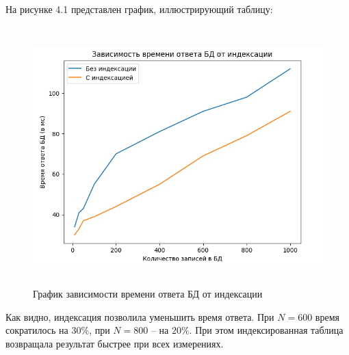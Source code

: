 На рисунке 4.1 представлен график, иллюстрирующий таблицу:
\FloatBarrier
\begin{figure}[h]	
	\begin{center}
		\includegraphics[height=10cm, width=\linewidth]{inc/graph.png}
	\end{center}
	\caption{График зависимости времени ответа БД от индексации}
\end{figure}
\FloatBarrier

Как видно, индексация позволила уменьшить время ответа. При $N=600$ время сократилось на $30\%$, при $N=800$ -- на $20\%$. При этом индексированная таблица возвращала результат быстрее при всех измерениях.